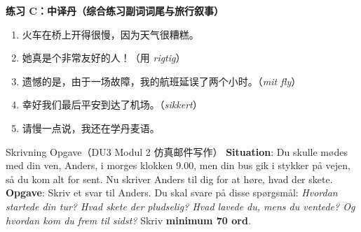 \textbf{练习 C：中译丹（综合练习副词词尾与旅行叙事）}
\begin{enumerate}
  \item 火车在桥上开得很慢，因为天气很糟糕。
  \item 她真是个非常友好的人！（用 \textit{rigtig}）
  \item 遗憾的是，由于一场故障，我的航班延误了两个小时。（\textit{mit fly}）
  \item 幸好我们最后平安到达了机场。（\textit{sikkert}）
  \item 请慢一点说，我还在学丹麦语。
\end{enumerate}


\begin{emailbox}{Skrivning Opgave（DU3 Modul 2 仿真邮件写作）}
\textbf{Situation}: Du skulle mødes med din ven, Anders, i morges klokken 9.00, men din bus gik i stykker på vejen, så du kom alt for sent. Nu skriver Anders til dig for at høre, hvad der skete.\\
\textbf{Opgave}: Skriv et svar til Anders. Du skal svare på disse spørgsmål: \textit{Hvordan startede din tur? Hvad skete der pludselig? Hvad lavede du, mens du ventede? Og hvordan kom du frem til sidst?} Skriv \textbf{minimum 70 ord}.
\end{emailbox}

